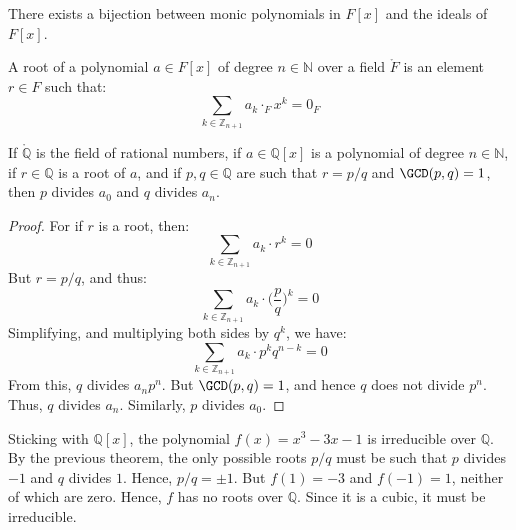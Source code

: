 \documentclass{article}                                                        %
\begin{document}
        \begin{theorem}
            There exists a bijection between monic polynomials in $F[x]$ and
            the ideals of $F[x]$.
        \end{theorem}
        \begin{definition}
            A root of a polynomial $a\in{F}[x]$ of degree $n\in\mathbb{N}$ over
            a field $\ring{F}$ is an element $r\in{F}$ such that:
            \begin{equation}
                \sum_{k\in\mathbb{Z}_{n+1}}a_{k}\cdot_{F}x^{k}=0_{F}
            \end{equation}
        \end{definition}
        \begin{theorem}
            If $\ring{\mathbb{Q}}$ is the field of rational numbers, if
            $a\in\mathbb{Q}[x]$ is a polynomial of degree $n\in\mathbb{N}$,
            if $r\in\mathbb{Q}$ is a root of $a$, and if $p,q\in\mathbb{Q}$
            are such that $r=p/q$ and $\GCD(p,q)=1$, then $p$ divides $a_{0}$
            and $q$ divides $a_{n}$.
        \end{theorem}
        \begin{proof}
            For if $r$ is a root, then:
            \begin{equation}
                \sum_{k\in\mathbb{Z}_{n+1}}a_{k}\cdot{r}^{k}=0
            \end{equation}
            But $r=p/q$, and thus:
            \begin{equation}
                \sum_{k\in\mathbb{Z}_{n+1}}a_{k}\cdot\big(\frac{p}{q}\big)^{k}
                =0
            \end{equation}
            Simplifying, and multiplying both sides by $q^{k}$, we have:
            \begin{equation}
                \sum_{k\in\mathbb{Z}_{n+1}}a_{k}\cdot{p}^{k}q^{n-k}=0
            \end{equation}
            From this, $q$ divides $a_{n}p^{n}$. But $\GCD(p,q)=1$, and hence
            $q$ does not divide $p^{n}$. Thus, $q$ divides $a_{n}$. Similarly,
            $p$ divides $a_{0}$.
        \end{proof}
        \begin{example}
            Sticking with $\mathbb{Q}[x]$, the polynomial $f(x)=x^{3}-3x-1$ is
            irreducible over $\mathbb{Q}$. By the previous theorem, the only
            possible roots $p/q$ must be such that $p$ divides $\minus{1}$ and
            $q$ divides $1$. Hence, $p/q=\pm{1}$. But $f(1)=\minus{3}$ and
            $f(\minus{1})=1$, neither of which are zero. Hence, $f$ has no roots
            over $\mathbb{Q}$. Since it is a cubic, it must be irreducible.
        \end{example}
\end{document}

